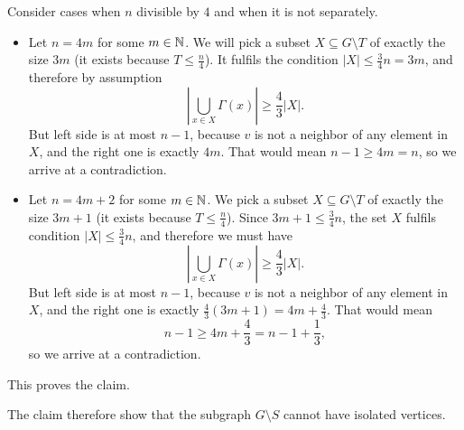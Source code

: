 \begin{exercise}{4}
\begin{itemize}
\begin{proof_claim}
            Consider cases when $n$ divisible by $4$ and when it is not separately.
            \begin{itemize}
                \item{} Let $n = 4m$ for some $m \in \mathbb{N}$. We will pick a subset $X
                    \subseteq G \setminus T$ of exactly the size $3m$
                    (it exists because $T \leq \frac{n}{4}$). It fulfils the
                    condition $|X| \leq \frac{3}{4} n = 3m$, and therefore by
                    assumption
                    \begin{equation*}
                        \left| \bigcup_{x \in X} \Gamma(x) \right| \geq \frac{4}{3}
                        |X|.
                    \end{equation*}
                    But left side is at most $n - 1$, because $v$ is not a neighbor
                    of any element in $X$, and the right one is exactly $4m$. That
                    would mean $n - 1 \geq 4m = n$, so we arrive at a contradiction.
                \item{} Let $n = 4m + 2$ for some $m \in \mathbb{N}$. We pick a subset $X
                    \subseteq G \setminus T$ of exactly the size $3m +
                    1$ (it exists because $T \leq \frac{n}{4}$). Since $3m + 1 \leq
                    \frac{3}{4}n$, the set $X$ fulfils condition $|X| \leq
                    \frac{3}{4} n$, and therefore we must have
                    \begin{equation*}
                        \left| \bigcup_{x \in X} \Gamma(x) \right| \geq \frac{4}{3}
                        |X|.
                    \end{equation*}
                    But left side is at most $n - 1$, because $v$ is not a neighbor
                    of any element in $X$, and the right one is exactly
                    $\frac{4}{3}(3m + 1) = 4m + \frac{4}{3}$. That would mean
                    \begin{equation*}
                        n - 1 \geq 4m + \frac{4}{3} = n - 1 + \frac{1}{3},
                    \end{equation*}
                    so we arrive at a contradiction.
            \end{itemize}
            This proves the claim.
        \end{proof_claim}

        The claim therefore show that the subgraph $G \setminus S$ cannot have
        isolated vertices.


\end{itemize}
\end{exercise}
